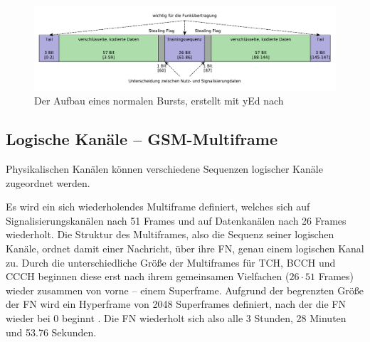 \begin{figure}[H]
  \begin{center}
    \includegraphics[width=1.0\textwidth]{figures/normal_burst.pdf}
  \end{center}
  \caption[Der Aufbau eines normalen Bursts]{Der Aufbau eines normalen Bursts, erstellt mit yEd nach } \label{fig:normal_burst} 
\end{figure}

\subsection{Logische Kanäle -- GSM-Multiframe}\label{hdl:logical-channels}

Physikalischen Kanälen können verschiedene Sequenzen logischer Kanäle zugeordnet werden.

Es wird ein sich wiederholendes Multiframe definiert, welches sich auf Signalisierungskanälen nach 51 Frames und auf Datenkanälen nach 26 Frames wiederholt. Die Struktur des Multiframes, also die Sequenz seiner logischen Kanäle, ordnet damit einer Nachricht, über ihre \ac{FN}, genau einem logischen Kanal zu. Durch die unterschiedliche Größe der Multiframes für \ac{TCH}, \ac{BCCH} und \ac{CCCH} beginnen diese erst nach ihrem gemeinsamen Vielfachen ($26 \cdot 51$ Frames) wieder zusammen von vorne -- einem Superframe. Aufgrund der begrenzten Größe der \ac{FN} wird ein Hyperframe von 2048 Superframes definiert, nach der die \ac{FN} wieder bei 0 beginnt . Die \ac{FN} wiederholt sich also alle 3 Stunden, 28 Minuten und 53.76 Sekunden. 

